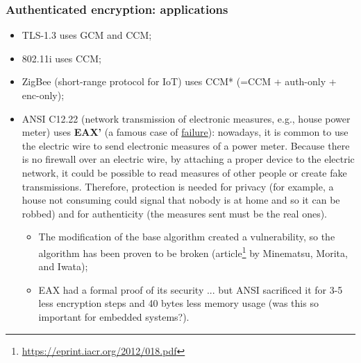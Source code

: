 \subsubsection*{Authenticated encryption: applications}
\begin{itemize}
    \item TLS-1.3 uses GCM and CCM;
    \item 802.11i uses CCM;
    \item ZigBee (short-range protocol for IoT) uses CCM* (=CCM + auth-only + enc-only);
    \item ANSI C12.22 (network transmission of electronic measures, e.g., house power meter) uses \textbf{EAX'} (a famous case of \underline{failure}): nowadays, it is common to use the electric wire to send electronic measures of a power meter. Because there is no firewall over an electric wire, by attaching a proper device to the electric network, it could be possible to read measures of other people or create fake transmissions. Therefore, protection is needed for privacy (for example, a house not consuming could signal that nobody is at home and so it can be robbed) and for authenticity (the measures sent must be the real ones).
          \begin{itemize}
              \item The modification of the base algorithm created a vulnerability, so the algorithm has been proven to be broken (article\footnote{\url{https://eprint.iacr.org/2012/018.pdf}} by Minematsu, Morita, and Iwata);
              \item EAX had a formal proof of its security ... but ANSI sacrificed it for 3-5 less encryption steps and 40 bytes less memory usage (was this so important for embedded systems?).
          \end{itemize}
\end{itemize}


